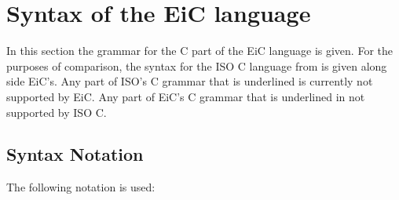 
\chapter{Syntax of the EiC language}
\label{chp:Syntax}

In this section the grammar for the C part of the EiC language is
given. For the purposes of comparison, the syntax for the ISO C
language from \cite{kernighan-ritchie88} is given along side EiC's.
Any part of ISO's C grammar that is underlined is currently not
supported by EiC. Any part of EiC's C grammar that is underlined
in not supported by ISO C.


\section{Syntax Notation}
\label{sec:SyntaxNotation}

The following notation is used:

